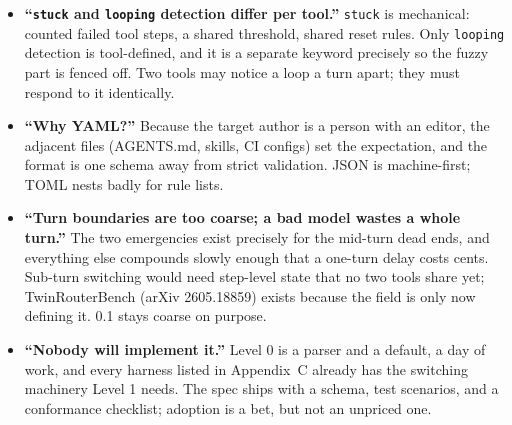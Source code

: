 \documentclass[11pt]{article}
\newcommand{\key}[1]{\texttt{#1}}
\begin{document}
\begin{itemize}
        manifest can express policy only over models the user could already
        reach.
  \item \textbf{``\key{stuck} and \key{looping} detection differ per
        tool.''} \key{stuck} is mechanical: counted failed tool steps, a
        shared threshold, shared reset rules. Only \key{looping} detection
        is tool-defined, and it is a separate keyword precisely so the
        fuzzy part is fenced off. Two tools may notice a loop a turn apart;
        they must respond to it identically.
  \item \textbf{``Why YAML?''} Because the target author is a person with an
        editor, the adjacent files (AGENTS.md, skills, CI configs) set the
        expectation, and the format is one schema away from strict
        validation. JSON is machine-first; TOML nests badly for rule lists.
  \item \textbf{``Turn boundaries are too coarse; a bad model wastes a whole
        turn.''} The two emergencies exist precisely for the mid-turn dead
        ends, and everything else compounds slowly enough that a one-turn
        delay costs cents. Sub-turn switching would need step-level state
        that no two tools share yet; TwinRouterBench (arXiv 2605.18859)
        exists because the field is only now defining it. 0.1 stays coarse
        on purpose.
  \item \textbf{``Nobody will implement it.''} Level 0 is a parser and a
        default, a day of work, and every harness listed in
        Appendix~C already has the switching machinery Level 1 needs. The
        spec ships with a schema, test scenarios, and a conformance
        checklist; adoption is a bet, but not an unpriced one.
\end{itemize}
\end{document}
